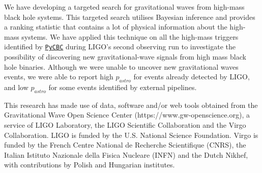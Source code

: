 \documentclass[%
preprint,
 amsmath,amssymb,
 aps,
]{revtex4}
\newcommand{\pycbc}{{\sc \href{https://pycbc.org/}{\texttt{PyCBC}}}\xspace}
\begin{document}
We have developing a targeted search for gravitational waves from high-mass black hole systems. This targeted search utilises Bayesian inference and provides a ranking statistic that contains a lot of physical information about the high-mass systems. We have applied this technique on all the high-mass triggers identified by \pycbc during LIGO's second observing run to investigate the possibility of discovering new gravitational-wave signals from high mass black hole binaries. Although we were unable to uncover new gravitational waves events, we were able to report high $p_{astro}$ for events already detected by LIGO, and low $p_{astro}$ for some events identified by external pipelines. 

\begin{acknowledgments}

This research has made use of data, software and/or web tools obtained from the Gravitational Wave Open Science Center (https://www.gw-openscience.org), a service of LIGO Laboratory, the LIGO Scientific Collaboration and the Virgo Collaboration. LIGO is funded by the U.S. National Science Foundation. Virgo is funded by the French Centre National de Recherche Scientifique (CNRS), the Italian Istituto Nazionale della Fisica Nucleare (INFN) and the Dutch Nikhef, with contributions by Polish and Hungarian institutes.

\end{acknowledgments}



\end{document}
